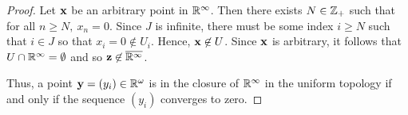 \begin{solution}
\begin{proof}
        Let $\mathbf{x}$ be an arbitrary point in $\mathbb{R}^\infty$.
        Then there exists $N \in \mathbb{Z}_+$ such that for all $n \geq N,~ x_n = 0$.
        Since $J$ is infinite, there must be some index $i \geq N$ such that $i \in J$ so that $x_i = 0 \not\in U_i$.
        Hence, $\mathbf{x} \not\in U$.
        Since $\mathbf{x}$ is arbitrary, it follows that $U \cap \mathbb{R}^\infty = \emptyset$ and so $\mathbf{z} \not \in \overline{\mathbb{R}^\infty}$.

        Thus, a point $\mathbf{y} = (y_i) \in \mathbb{R}^\omega$ is in the closure of $\mathbb{R}^\infty$ in the uniform topology if and only if the sequence $(y_i)$ converges to zero.
    \end{proof}
\end{solution}